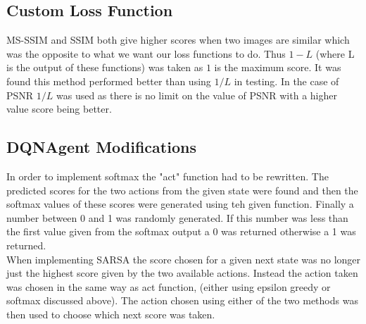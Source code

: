 \documentclass[10pt,twocolumn,letterpaper]{article}
\begin{document}
\FloatBarrier

\subsection{Custom Loss Function}\label{app:loss}
MS-SSIM and SSIM both give higher scores when two images are similar which was the opposite to what we want our loss functions to do. Thus $1-L$ (where L is the output of these functions) was taken as $1$ is the maximum score. It was found this method performed better than using $1/L$ in testing. In the case of PSNR $1/L$ was used as there is no limit on the value of PSNR with a higher value score being better. 

\subsection{DQNAgent Modifications}\label{app:modifications}
In order to implement softmax the "act" function had to be rewritten. The predicted scores for the two actions from the given state were found and then the softmax values of these scores were generated using teh given function. Finally a number between 0 and 1 was randomly generated. If this number was less than the first value given from the softmax output a 0 was returned otherwise a 1 was returned. \\
When implementing SARSA the score chosen for a given next state was no longer just the highest score given by the two available actions. Instead the action taken was chosen in the same way as act function, (either using epsilon greedy or softmax discussed above). The action chosen using either of the two methods was then used to choose which next score was taken.
\end{document}

